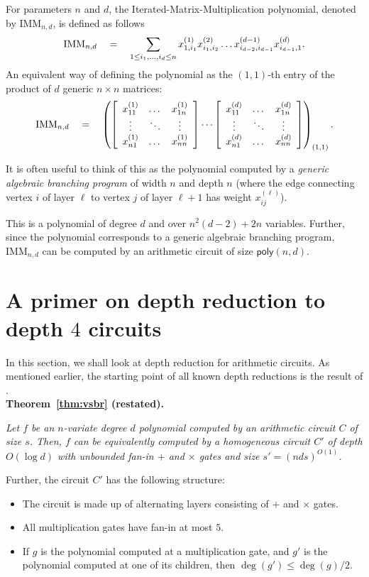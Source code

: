 \documentclass[12pt]{report}
\newcommand{\IMM}{\mathrm{IMM}}
\newcommand{\poly}{\mathsf{poly}}
\begin{document}
For parameters $n$ and $d$, the Iterated-Matrix-Multiplication polynomial, denoted by $\IMM_{n,d}$, is defined as follows
$$
\IMM_{n,d} \spaced{=} \sum_{1\leq i_1,\dots, i_d\leq n} x_{1,i_1}^{(1)}x_{i_1,i_2}^{(2)}\dots x_{i_{d-2},i_{d-1}}^{(d-1)}x_{i_{d-1},1}^{(d)}.
$$
An equivalent way of defining the polynomial as the $(1,1)$-th entry of the product of $d$ generic $n\times n$ matrices:
$$
\IMM_{n,d} \spaced{=} \inparen{\insquare{\begin{array}{ccc} x_{11}^{(1)} & \dots & x_{1n}^{(1)}\\ \vdots & \ddots & \vdots \\ x_{n1}^{(1)} & \dots & x_{nn}^{(1)}\end{array}} \cdots \insquare{\begin{array}{ccc} x_{11}^{(d)} & \dots & x_{1n}^{(d)}\\ \vdots & \ddots & \vdots \\ x_{n1}^{(d)} & \dots & x_{nn}^{(d)}\end{array}}}_{(1,1)}.
$$

It is often useful to think of this as the polynomial computed by a \emph{generic algebraic branching program} of width $n$ and depth $n$ (where the edge connecting vertex $i$ of layer $\ell$ to vertex $j$ of layer $\ell+1$ has weight $x_{ij}^{(\ell)}$). 

This is a polynomial of degree $d$ and over $n^2(d-2) + 2n$ variables. Further, since the polynomial corresponds to a generic algebraic branching program, $\IMM_{n,d}$ can be computed by an arithmetic circuit of size $\poly(n,d)$. 

\section{A primer on depth reduction to depth $4$ circuits}\label{sec:depth-red}

In this section, we shall look at depth reduction for arithmetic circuits. As mentioned earlier, the starting point of all known depth reductions is the result of \cite{vsbr83}. \\

{\bf Theorem~\ref{thm:vsbr} (restated).} {\em Let $f$ be an $n$-variate degree $d$ polynomial computed by an arithmetic circuit $C$ of size $s$. Then, $f$ can be equivalently computed by a homogeneous circuit $C'$ of depth $O(\log d)$ with unbounded fan-in $+$ and $\times$ gates and size $s' = (nds)^{O(1)}$. 

Further, the circuit $C'$ has the following structure:
\begin{itemize}
\item The circuit is made up of alternating layers consisting of $+$ and $\times$  gates. 
\item All multiplication gates have fan-in at most $5$.
\item If $g$ is the polynomial computed at a multiplication gate, and $g'$ is the polynomial computed at one of its children, then $\deg(g') \leq \deg(g)/2$. 
\end{itemize}
}
\end{document}
